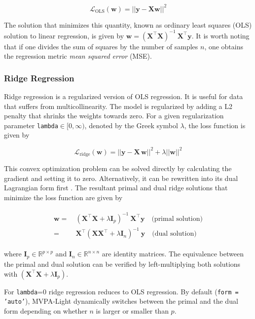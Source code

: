 \documentclass[utf8]{frontiersSCNS} %
\newcommand{\w}{\mathbf{w}}
\newcommand{\y}{\mathbf{y}}
\newcommand{\I}{\mathbf{I}}
\renewcommand{\L}{\mathcal{L}}
\newcommand{\R}{\mathbb{R}}
\newcommand{\X}{\mathbf{X}}
\newcommand{\ttt}[1]{\texttt{#1}}
\begin{document}
\begin{equation}
\label{eq:linreg_loss_function}
\L_\text{OLS}(\w) = ||\y - \X\w||^2
\end{equation}

The solution that minimizes this quantity, known as ordinary least squares (OLS) solution to linear regression, is given by $\w = (\X^\top\X)^{-1}\ \X^\top\y$. It is worth noting that if one divides the sum of squares by the number of samples $n$, one obtains the regression metric \textit{mean squared error} (MSE).

\subsubsection{Ridge Regression}

Ridge regression is a regularized version of OLS regression. It is useful for data that suffers from multicollinearity. The model is regularized by adding a L2 penalty that shrinks the weights towards zero. For a given regularization parameter \ttt{lambda}$\in[0,\infty)$, denoted by the Greek symbol $\lambda$, the loss function is given by

\begin{equation}
\label{eq:ridge_loss_function}
\L_\text{ridge}(\w) = ||\y - \X\,\w||^2 + \lambda ||\w||^2
\end{equation}

This convex optimization problem can be solved directly by calculating the gradient and setting it to zero. Alternatively, it can be rewritten into its dual Lagrangian form first  
\citep{Bishop2007}. The resultant primal and dual ridge solutions that minimize the loss function are given by

\begin{align}
\begin{split}
\label{eq:ridge}
\w =\ & (\X^\top\X + \lambda\I_p)^{-1}\ \X^\top\y \quad\text{(primal solution)}\\
 =\ & \X^\top (\X\X^\top + \lambda\I_n)^{-1}\ \y \quad\text{(dual solution)}
\end{split}
\end{align}

where $\I_p\in\R^{p\times p}$ and $\I_n\in\R^{n\times n}$ are identity matrices. The equivalence between the primal and dual solution can be verified by left-multiplying both solutions with $(\X^\top\X + \lambda\I_p)$.

For \ttt{lambda}=0 ridge regression reduces to OLS regression. By default (\ttt{form = 'auto'}), MVPA-Light dynamically switches between the primal and the dual form depending on whether $n$ is larger or smaller than $p$.
\end{document}
